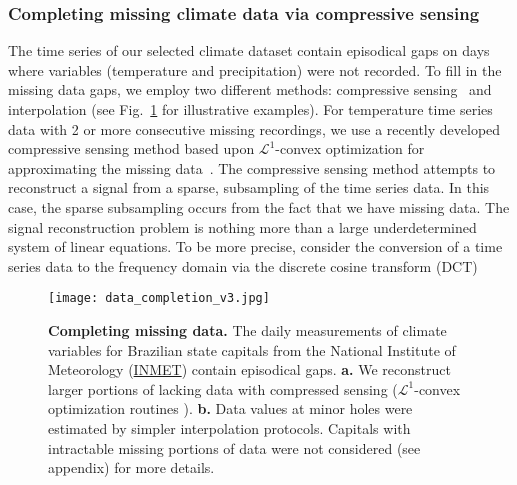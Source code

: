 \documentclass[final,leqno]{siamltexmm2}
\begin{document}
\subsubsection*{Completing missing climate data via compressive sensing}
%
The time series of our selected climate dataset contain episodical gaps on days where 
variables (temperature and precipitation) were not recorded. To fill in the missing data gaps, we employ two 
different methods: compressive sensing~\cite{Kutz,cs1,cs2,cs3,cs4} and interpolation (see Fig.~\ref{fig1} for illustrative examples). For temperature time series data with 2 or more consecutive missing recordings, we 
use a recently developed compressive sensing method based upon $\mathcal{L}^{1}$-convex optimization
for approximating the missing data~\cite{Kutz,cs1,cs2,cs3,cs4}.  
%
The compressive sensing method attempts to reconstruct a signal from a sparse, subsampling
of the time series data.  In this case, the sparse subsampling occurs from the fact that we have missing
data.  The signal reconstruction problem is nothing more than a large underdetermined system of linear equations.  To be more precise, consider the conversion of a time series data to the frequency domain via the discrete cosine transform (DCT) 
\begin{figure}[!t]
\texttt{[image: data\_completion\_v3.jpg]}
\caption{{\bf Completing missing data.} The daily measurements of climate variables for Brazilian state capitals 
from the National Institute of Meteorology  (\href{http://www.inmet.gov.br/portal/}{INMET}) contain episodical gaps. 
\textbf{a.} We reconstruct larger portions of lacking data with compressed sensing ($\mathcal{L}^{1}$-convex 
optimization routines ). \textbf{b.} Data values at minor holes were estimated by simpler
interpolation protocols. Capitals with intractable missing portions of data were not considered (see appendix)
for more details.}
\label{fig1}
\end{figure}
%
%
\end{document}
